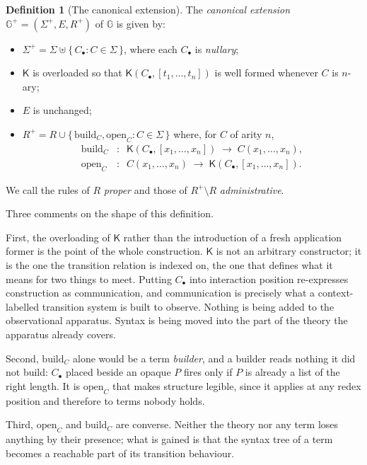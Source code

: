 \documentclass[11pt]{article}
\theoremstyle{plain}
\theoremstyle{definition}
\newtheorem{definition}[theorem]{Definition}
\newcommand{\Kc}{\mathsf{K}}
\newcommand{\Gg}{\mathbb{G}}
\newcommand{\op}{\mathrm{open}}
\newcommand{\bd}{\mathrm{build}}
\begin{document}
\begin{definition}[The canonical extension]
\label{def:ext}
The \emph{canonical extension} $\Gg^+ = (\Sigma^+, E, R^+)$ of $\Gg$ is given by:
\begin{itemize}
\item $\Sigma^+ = \Sigma \uplus \{\, C_\bullet : C \in \Sigma \,\}$, where each $C_\bullet$ is
\emph{nullary};
\item $\Kc$ is overloaded so that $\Kc(C_\bullet, [t_1,\dots,t_n])$ is well formed whenever $C$ is
$n$-ary;
\item $E$ is unchanged;
\item $R^+ = R \cup \{\, \bd_C, \op_C : C \in \Sigma \,\}$ where, for $C$ of arity $n$,
\begin{align*}
\bd_C &: \;\; \Kc(C_\bullet, [x_1,\dots,x_n]) \;\longrightarrow\; C(x_1,\dots,x_n), \\
\op_C &: \;\; C(x_1,\dots,x_n) \;\longrightarrow\; \Kc(C_\bullet, [x_1,\dots,x_n]).
\end{align*}
\end{itemize}
We call the rules of $R$ \emph{proper} and those of $R^+ \setminus R$ \emph{administrative}.
\end{definition}

Three comments on the shape of this definition.

First, the overloading of $\Kc$ rather than the introduction of a fresh application former is the
point of the whole construction. $\Kc$ is not an arbitrary constructor; it is the one the transition
relation is indexed on, the one that defines what it means for two things to meet. Putting $C_\bullet$
into interaction position re-expresses construction as communication, and communication is precisely
what a context-labelled transition system is built to observe. Nothing is being added to the
observational apparatus. Syntax is being moved into the part of the theory the apparatus already
covers.

Second, $\bd_C$ alone would be a term \emph{builder}, and a builder reads nothing it did not build:
$C_\bullet$ placed beside an opaque $P$ fires only if $P$ is already a list of the right length. It is
$\op_C$ that makes structure legible, since it applies at any redex position and therefore to terms
nobody holds.

Third, $\op_C$ and $\bd_C$ are converse. Neither the theory nor any term loses anything by their
presence; what is gained is that the syntax tree of a term becomes a reachable part of its transition
behaviour.
\end{document}

